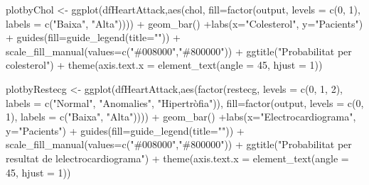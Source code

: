 \documentclass[
]{article}
\newenvironment{Shaded}{\begin{snugshade}}{\end{snugshade}}
\newcommand{\AttributeTok}[1]{\textcolor[rgb]{0.80,0.80,0.80}{#1}}
\newcommand{\DecValTok}[1]{\textcolor[rgb]{0.86,0.86,0.80}{#1}}
\newcommand{\FunctionTok}[1]{\textcolor[rgb]{0.94,0.94,0.56}{#1}}
\newcommand{\NormalTok}[1]{\textcolor[rgb]{0.80,0.80,0.80}{#1}}
\newcommand{\OtherTok}[1]{\textcolor[rgb]{0.94,0.94,0.56}{#1}}
\newcommand{\SpecialCharTok}[1]{\textcolor[rgb]{0.86,0.64,0.64}{#1}}
\newcommand{\StringTok}[1]{\textcolor[rgb]{0.80,0.58,0.58}{#1}}
\begin{document}
\begin{Shaded}
\begin{Highlighting}[]
\NormalTok{plotbyChol }\OtherTok{\textless{}{-}} \FunctionTok{ggplot}\NormalTok{(dfHeartAttack,}\FunctionTok{aes}\NormalTok{(chol, }\AttributeTok{fill=}\FunctionTok{factor}\NormalTok{(output, }\AttributeTok{levels =} \FunctionTok{c}\NormalTok{(}\DecValTok{0}\NormalTok{, }\DecValTok{1}\NormalTok{), }\AttributeTok{labels =} \FunctionTok{c}\NormalTok{(}\StringTok{"Baixa"}\NormalTok{, }\StringTok{"Alta"}\NormalTok{)))) }\SpecialCharTok{+} 
                    \FunctionTok{geom\_bar}\NormalTok{() }\SpecialCharTok{+}\FunctionTok{labs}\NormalTok{(}\AttributeTok{x=}\StringTok{"Colesterol"}\NormalTok{, }\AttributeTok{y=}\StringTok{"Pacients"}\NormalTok{) }\SpecialCharTok{+} 
                    \FunctionTok{guides}\NormalTok{(}\AttributeTok{fill=}\FunctionTok{guide\_legend}\NormalTok{(}\AttributeTok{title=}\StringTok{""}\NormalTok{)) }\SpecialCharTok{+} 
                  \FunctionTok{scale\_fill\_manual}\NormalTok{(}\AttributeTok{values=}\FunctionTok{c}\NormalTok{(}\StringTok{"\#008000"}\NormalTok{,}\StringTok{"\#800000"}\NormalTok{)) }\SpecialCharTok{+} 
                    \FunctionTok{ggtitle}\NormalTok{(}\StringTok{"Probabilitat per colesterol"}\NormalTok{) }\SpecialCharTok{+}
          \FunctionTok{theme}\NormalTok{(}\AttributeTok{axis.text.x =} \FunctionTok{element\_text}\NormalTok{(}\AttributeTok{angle =} \DecValTok{45}\NormalTok{, }\AttributeTok{hjust =} \DecValTok{1}\NormalTok{))}

\NormalTok{plotbyRestecg }\OtherTok{\textless{}{-}} \FunctionTok{ggplot}\NormalTok{(dfHeartAttack,}\FunctionTok{aes}\NormalTok{(}\FunctionTok{factor}\NormalTok{(restecg, }\AttributeTok{levels =} \FunctionTok{c}\NormalTok{(}\DecValTok{0}\NormalTok{, }\DecValTok{1}\NormalTok{, }\DecValTok{2}\NormalTok{), }\AttributeTok{labels =} \FunctionTok{c}\NormalTok{(}\StringTok{"Normal"}\NormalTok{, }\StringTok{"Anomalies"}\NormalTok{, }\StringTok{"Hipertròfia"}\NormalTok{)), }\AttributeTok{fill=}\FunctionTok{factor}\NormalTok{(output, }\AttributeTok{levels =} \FunctionTok{c}\NormalTok{(}\DecValTok{0}\NormalTok{, }\DecValTok{1}\NormalTok{), }\AttributeTok{labels =} \FunctionTok{c}\NormalTok{(}\StringTok{"Baixa"}\NormalTok{, }\StringTok{"Alta"}\NormalTok{)))) }\SpecialCharTok{+} 
                    \FunctionTok{geom\_bar}\NormalTok{() }\SpecialCharTok{+}\FunctionTok{labs}\NormalTok{(}\AttributeTok{x=}\StringTok{"Electrocardiograma"}\NormalTok{, }\AttributeTok{y=}\StringTok{"Pacients"}\NormalTok{) }\SpecialCharTok{+} 
                    \FunctionTok{guides}\NormalTok{(}\AttributeTok{fill=}\FunctionTok{guide\_legend}\NormalTok{(}\AttributeTok{title=}\StringTok{""}\NormalTok{)) }\SpecialCharTok{+} 
                  \FunctionTok{scale\_fill\_manual}\NormalTok{(}\AttributeTok{values=}\FunctionTok{c}\NormalTok{(}\StringTok{"\#008000"}\NormalTok{,}\StringTok{"\#800000"}\NormalTok{)) }\SpecialCharTok{+} 
                    \FunctionTok{ggtitle}\NormalTok{(}\StringTok{"Probabilitat per resultat de l\textquotesingle{}electrocardiograma"}\NormalTok{) }\SpecialCharTok{+}
          \FunctionTok{theme}\NormalTok{(}\AttributeTok{axis.text.x =} \FunctionTok{element\_text}\NormalTok{(}\AttributeTok{angle =} \DecValTok{45}\NormalTok{, }\AttributeTok{hjust =} \DecValTok{1}\NormalTok{))}


\end{Highlighting}
\end{Shaded}
\end{document}

